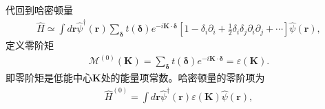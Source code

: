 \documentclass[10pt, oneside]{article}
\begin{document}
代回到哈密顿量
\begin{align}
	\boxed{
			\hat{H} \simeq \int d \bm{r} \hat{\psi}^{\dagger} \left(\bm{r}\right) \sum_{\bm{\delta}} t \left(\bm{\delta}\right) e^{-i \bm{K} \cdot \bm{\delta}} \left[1 -  \delta_{i} \partial_{i} +  \frac12 \delta_{i}  \delta_{j}  \partial_{i} \partial_{j} + \cdots \right] \hat{\psi} \left(\bm{r}\right) ,
	}
\end{align}
定义零阶矩
\begin{align}
	\mathcal{M}^{\left(0\right)} \left(\bm{K}\right) = \sum_{\bm{\delta}} t \left(\bm{\delta}\right)  e^{-i \bm{K} \cdot \bm{\delta}} = \varepsilon \left(\bm{K}\right).
\end{align}
即零阶矩是低能中心\(\bm{K}\)处的能量项常数。哈密顿量的零阶项为
\begin{align}
	\hat{H}^{\left(0\right)} = \int d \bm{r} \hat{\psi}^{\dagger} \left(\bm{r}\right) \varepsilon \left(\bm{K}\right) \hat{\psi} \left(\bm{r}\right) ,
\end{align}
\end{document}

